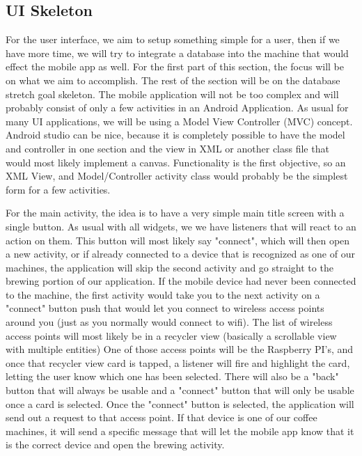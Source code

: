 \documentclass[conference]{IEEEtran}
\begin{document}
\subsection{UI Skeleton}
For the user interface, we aim to setup something simple for a user, then if we
have more time, we will try to integrate a database into the machine that would
effect the mobile app as well. For the first part of this section, the focus will be
on what we aim to accomplish. The rest of the section will be on the database
stretch goal skeleton. The mobile application will not be too complex and will
probably consist of only a few activities in an Android Application. As usual
for many UI applications, we will be using a Model View Controller (MVC)     
concept.  Android studio can be nice, because it is completely possible to have
the model and controller in one section and the view in XML or another class
file that would most likely implement a canvas. Functionality is the first
objective, so an XML View, and Model/Controller activity class would probably
be the simplest form for a few activities.

For the main activity, the idea is to have a very simple main title screen
with a single button. As usual with all widgets, we we have listeners that will
react to an action on them. This button will most likely say "connect", which
will then open a new activity, or if already connected to a device that is
recognized as one of our machines, the application will skip the second
activity and go straight to the brewing portion of our application. 
If the mobile device had never been connected to the machine, the first
activity would take you to the next activity on a "connect" button push that
would let you connect to wireless access points around you (just as you
normally would connect to wifi). The list of wireless access points will most
likely be in a recycler view (basically a scrollable view with multiple
entities) One of those access points will be the Raspberry PI's, and once that
recycler view card is tapped, a listener will fire and highlight the card,
letting the user know which one has been selected. There will also be a "back"
button that will always be usable and a "connect" button that will only be
usable once a card is selected. Once the "connect" button is selected, the
application will send out a request to that access point. If that device is one
of our coffee machines, it will send a specific message that will let the
mobile app know that it is the correct device and open the brewing activity.
\end{document}
